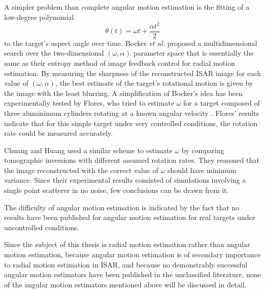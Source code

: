 A simpler problem than complete angular motion estimation is the fitting of
a low-degree polynomial 
\begin{equation}
\theta(t)=\omega t+\frac{\alpha t^2}{2}
\end{equation}
to the target's aspect angle over time.  Bocker {\em et al.\/} \cite{Boc91}
proposed a multidimensional search over the two-dimensional
$(\omega,\alpha)$ parameter space that is essentially the same as their
entropy method of image feedback control for radial motion estimation. By
measuring the sharpness of the reconstructed ISAR image for each value of
$(\omega,\alpha)$, the best estimate of the target's rotational motion is
given by the image with the least blurring.  A simplification of Bocker's
idea has been experimentally tested by Flores, who tried to estimate
$\omega$ for a target composed of three aluminimum cylinders rotating at a
known angular velocity \cite{Flo90}.  Flores' results indicate that for
this simple target under very controlled conditions, the rotation rate
could be measured accurately.

Chuang and Huang \cite{Chu92} used a similar scheme to estimate $\omega$ by
comparing tomographic inversions with different assumed rotation rates. They
reasoned that the image reconstructed with the correct value of $\omega$
should have minimum variance.  Since their experimental results consisted of
simulations involving a single point scatterer in no noise, few conclusions
can be drawn from it.

The difficulty of angular motion estimation is indicated by the fact that no
results have been published for angular motion estimation for real targets
under uncontrolled conditions.  

Since the subject of this thesis is radial motion estimation rather than 
angular motion estimation, because angular motion estimation is of
secondary importance to radial motion estimation in ISAR, and because no
demonstrably successful angular motion estimators have been published in
the unclassified literature, none of the angular motion estimators
mentioned above will be discussed in detail.

